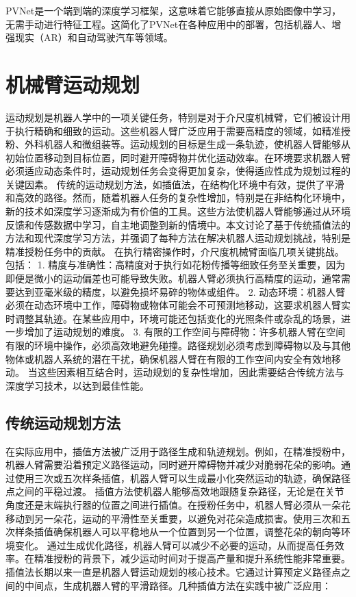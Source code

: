 PVNet是一个端到端的深度学习框架，这意味着它能够直接从原始图像中学习，无需手动进行特征工程。这简化了PVNet在各种应用中的部署，包括机器人、增强现实（AR）和自动驾驶汽车等领域。


\section{机械臂运动规划}
运动规划是机器人学中的一项关键任务，特别是对于介尺度机械臂，它们被设计用于执行精确和细致的运动。这些机器人臂广泛应用于需要高精度的领域，如精准授粉、外科机器人和微组装等。运动规划的目标是生成一条轨迹，使机器人臂能够从初始位置移动到目标位置，同时避开障碍物并优化运动效率。在环境要求机器人臂必须适应动态条件时，运动规划任务会变得更加复杂，使得适应性成为规划过程的关键因素。
传统的运动规划方法，如插值法，在结构化环境中有效，提供了平滑和高效的路径。然而，随着机器人任务的复杂性增加，特别是在非结构化环境中，新的技术如深度学习逐渐成为有价值的工具。这些方法使机器人臂能够通过从环境反馈和传感数据中学习，自主地调整到新的情境中。本文讨论了基于传统插值法的方法和现代深度学习方法，并强调了每种方法在解决机器人运动规划挑战，特别是精准授粉任务中的贡献。
在执行精密操作时，介尺度机械臂面临几项关键挑战。包括：
1.	精度与准确性：高精度对于执行如花粉传播等细致任务至关重要，因为即便是微小的运动偏差也可能导致失败。机器人臂必须执行高精度的运动，通常需要达到亚毫米级的精度，以避免损坏易碎的物体或组件。
2.	动态环境：机器人臂必须在动态环境中工作，障碍物或物体可能会不可预测地移动，这要求机器人臂实时调整其轨迹。在某些应用中，环境可能还包括变化的光照条件或杂乱的场景，进一步增加了运动规划的难度。
3.	有限的工作空间与障碍物：许多机器人臂在空间有限的环境中操作，必须高效地避免碰撞。路径规划必须考虑到障碍物以及与其他物体或机器人系统的潜在干扰，确保机器人臂在有限的工作空间内安全有效地移动。
当这些因素相互结合时，运动规划的复杂性增加，因此需要结合传统方法与深度学习技术，以达到最佳性能。



\subsection{传统运动规划方法}

在实际应用中，插值方法被广泛用于路径生成和轨迹规划。例如，在精准授粉中，机器人臂需要沿着预定义路径运动，同时避开障碍物并减少对脆弱花朵的影响。通过使用三次或五次样条插值，机器人臂可以生成最小化突然运动的轨迹，确保路径点之间的平稳过渡。
插值方法使机器人能够高效地跟随复杂路径，无论是在关节角度还是末端执行器的位置之间进行插值。在授粉任务中，机器人臂必须从一朵花移动到另一朵花，运动的平滑性至关重要，以避免对花朵造成损害。使用三次和五次样条插值确保机器人可以平稳地从一个位置到另一个位置，调整花朵的朝向等环境变化。
通过生成优化路径，机器人臂可以减少不必要的运动，从而提高任务效率。在精准授粉的背景下，减少运动时间对于提高产量和提升系统性能非常重要。
插值法长期以来一直是机器人臂运动规划的核心技术。它通过计算预定义路径点之间的中间点，生成机器人臂的平滑路径。几种插值方法在实践中被广泛应用：

